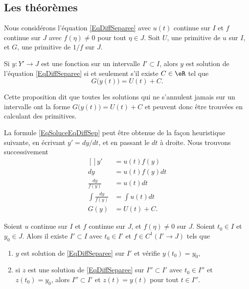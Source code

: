 \subsection{Les théorèmes}

\begin{proposition}     \label{ProJLykrK}
Nous considérons l'équation \eqref{EqDiffSeparee} avec $u(t)$ continue sur $I$ et $f$ continue sur $J$ avec $f(\eta)\neq 0$ pour tout $\eta\in J$. Soit $U$, une primitive de $u$ sur $I$, et $G$, une primitive de $1/f$ sur $J$.

Si $y\colon Y'\to J$ est une fonction sur un intervalle $I'\subset I$, alors $y$ est
  solution de l'équation \eqref{EqDiffSeparee} si et seulement s'il existe $C\in\eR$ tel que
\begin{equation}		\label{EqSoluceEqDiffSep}
	G\big( y(t) \big)=U(t)+C.
\end{equation}
\end{proposition}
Cette proposition dit que toutes les solutions qui ne s'annulent jamais sur un intervalle ont la forme $G\big( y(t) \big)=U(t)+C$ et peuvent donc être trouvées en calculant des primitives.

La formule \eqref{EqSoluceEqDiffSep} peut être obtenue de la façon heuristique suivante, en écrivant $y'=dy/dt$, et en passant le $dt$ à droite. Nous trouvons successivement
\begin{equation}
	\begin{aligned}[]
		y'&=u(t)f(y)\\
		dy&=u(t)f(y)dt\\
		\frac{ dy }{ f(y) }&=u(t)dt\\
		\int\frac{ dy }{ f(y) }&=\int u(t)dt\\
		G(y)&=U(t)+C.
	\end{aligned}
\end{equation}

\begin{proposition} \label{PropOkmXmC}
Soient $u$ continue sur $I$ et $f$ continue sur $J$, et $f(\eta)\neq 0$ sur $J$. Soient $t_0\in I$ et $y_0\in J$. Alors il existe $I'\subset I$ avec $t_0\in I'$ et $f\in C^1(I'\to J)$ tels que
\begin{enumerate}

\item
$y$ est solution de \eqref{EqDiffSeparee} sur $I'$ et vérifie $y(t_0)=y_0$,
\item
si $z$ est une solution de \eqref{EqDiffSeparee} sur $I''\subset I'$ avec $t_0\in I''$ et $z(t_0)=y_0$, alors $I''\subset I'$ et $z(t)=y(t)$ pour tout $t\in I''$.

\end{enumerate}
\end{proposition}

